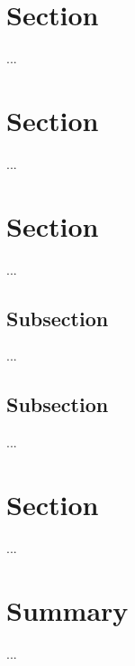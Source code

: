 \documentclass[12pt, a4paper]{article}
\begin{document}
\section{Section}
...

\section{Section}
...

\section{Section}
...

\subsection{Subsection}
...

\subsection{Subsection}
...

\section{Section}
...

\section{Summary}
...
\end{document}
